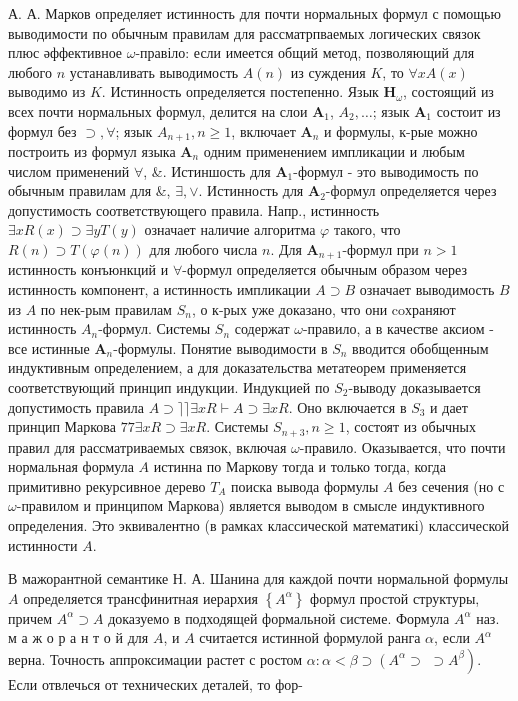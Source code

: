 \documentclass[10pt]{article}
\begin{document}
А. А. Марков определяет истинность для почти нормальных формул с помощью выводимости по обычным правилам для рассматрпваемых логических связок плюс әффективное $\omega$-правіло: если имеется общий метод, позволяющий для любого $n$ устанавливать выводимость $A(n)$ из суждения $K$, то $\forall x A(x)$ выводимо из $K$. Истинность определяется постепенно. Язык $\boldsymbol{H}_{\omega}$, состоящий из всех почти нормальных формул, делится на слои $\boldsymbol{A}_{1}$, $A_{2}, \ldots$; язык $\boldsymbol{A}_{1}$ состоит из формул без $\supset, \forall$; язык $A_{n+1}, n \geqslant 1$, включает $\boldsymbol{A}_{n}$ и формулы, к-рые можно построить из формул языка $\boldsymbol{A}_{n}$ одним применением импликации и любым числом применений $\forall$, \&. Истиншость для $\boldsymbol{A}_{1}$-формул - это выводимость по обычным правилам для \&, $\exists, \vee$. Истинность для $\boldsymbol{A}_{2}$-формул определяется через допустимость соответствующего правила. Напр., истинность $\exists x R(x) \supset \exists y T(y)$ означает наличие алгоритма $\varphi$ такого, что $R(n) \supset T(\varphi(n))$ для любого числа $n$. Для $\boldsymbol{A}_{n+1}$-формул при $n>1$ истинность конъюнкций и $\forall$-формул определяется обычным образом через истинность компонент, а истинность импликации $A \supset B$ означает выводимость $B$ из $A$ по нек-рым правилам $S_{n}$, о к-рых уже доказано, что они coхраняют истинность $A_{n}$-формул. Системы $S_{n}$ содержат $\omega$-правило, а в качестве аксиом - все истинные $\boldsymbol{A}_{n}$-формулы. Понятие выводимости в $S_{n}$ вводится обобщенным индуктивным определением, а для доказательства метатеорем применяется соответствующий принцип индукции. Индукцией по $S_{2}$-выводу доказывается допустимость правила $A \supset\rceil\rceil \exists x R \vdash A \supset \exists x R$. Оно включается в $S_{3}$ и дает принцип Маркова $77 \exists x R \supset \exists x R$. Системы $S_{n+3}, n \geqslant 1$, состоят из обычных правил для рассматриваемых связок, включая $\omega$-правило. Оказывается, что почти нормальная формула $A$ истинна по Маркову тогда и только тогда, когда примитивно рекурсивное дерево $T_{A}$ поиска вывода формулы $A$ без сечения (но с $\omega$-правилом и принципом Маркова) является выводом в смысле индуктивного определения. Это эквивалентно (в рамках классической математикі) классической истинности $A$.



В мажорантной семантике Н. А. Шанина для каждой почти нормальной формулы $A$ определяется трансфинитная иерархия $\left\{A^{\alpha}\right\}$ формул простой структуры, причем $A^{\alpha} \supset A$ доказуемо в подходящей формальной системе. Формула $A^{\alpha}$ наз. м а ж о р а н т о й для $A$, и $A$ считается истинной формулой ранга $\alpha$, если $A^{\alpha}$ верна. Точность аппроксимации растет с ростом $\alpha: \alpha<\beta \supset\left(A^{\alpha} \supset\right.$ $\left.\supset A^{\beta}\right)$. Если отвлечься от технических деталей, то фор-
\end{document}
